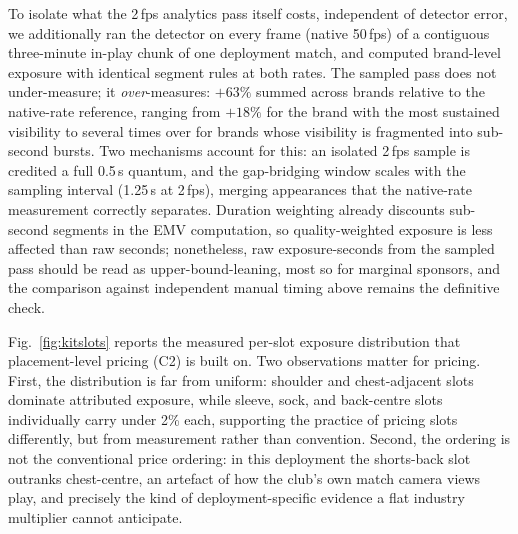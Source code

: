\documentclass[conference,a4paper]{IEEEtran}
\begin{document}
To isolate what the 2\,fps analytics pass itself costs, independent of detector
error, we additionally ran the detector on every frame (native 50\,fps) of a
contiguous three-minute in-play chunk of one deployment match, and computed
brand-level exposure with identical segment rules at both rates. The sampled pass
does not under-measure; it \emph{over}-measures: $+63\%$ summed across brands
relative to the native-rate reference, ranging from $+18\%$ for the brand with the
most sustained visibility to several times over for brands whose visibility is
fragmented into sub-second bursts. Two mechanisms account for this: an isolated
2\,fps sample is credited a full 0.5\,s quantum, and the gap-bridging window scales
with the sampling interval (1.25\,s at 2\,fps), merging appearances that the
native-rate measurement correctly separates. Duration weighting already discounts
sub-second segments in the EMV computation, so quality-weighted exposure is less
affected than raw seconds; nonetheless, raw exposure-seconds from the sampled pass
should be read as upper-bound-leaning, most so for marginal sponsors, and the
comparison against independent manual timing above remains the definitive check.

Fig.~\ref{fig:kitslots} reports the measured per-slot exposure distribution that
placement-level pricing (C2) is built on. Two observations matter for pricing. First,
the distribution is far from uniform: shoulder and chest-adjacent slots dominate
attributed exposure, while sleeve, sock, and back-centre slots individually carry
under 2\% each, supporting the practice of pricing slots differently, but from
measurement rather than convention. Second, the ordering is not the conventional
price ordering: in this deployment the shorts-back slot outranks chest-centre,
an artefact of how the club's own match camera views play, and precisely the
kind of deployment-specific evidence a flat industry multiplier cannot anticipate.
\end{document}
